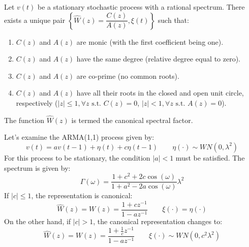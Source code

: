 \begin{theorem}
    Let $v(t)$ be a stationary stochastic process with a rational spectrum.
    There exists a unique pair $\left\{ \hat{W}(z)=\dfrac{C(z)}{A(z)},\xi(t) \right\}$ such that:
    \begin{enumerate}
        \item $C(z)$ and $A(z)$ are monic (with the first coefficient being one).
        \item $C(z)$ and $A(z)$ have the same degree (relative degree equal to zero).
        \item $C(z)$ and $A(z)$ are co-prime (no common roots).
        \item $C(z)$ and $A(z)$ have all their roots in the closed and open unit circle, respectively ($\left\lvert z \right\rvert \leq 1, \forall z \text{ s.t. } C(z)=0$, $\left\lvert z \right\rvert < 1, \forall z \text{ s.t. } A(z)=0$).
    \end{enumerate}
\end{theorem}  
The function $\hat{W}(z)$ is termed the canonical spectral factor.
\begin{example}
    Let's examine the ARMA(1,1) process given by:
    \[v(t)=av(t-1)+\eta(t)+c\eta(t-1) \qquad \eta(\cdot)\sim WN(0,\lambda^2)\]
    For this process to be stationary, the condition $\left\lvert a \right\rvert < 1$ must be satisfied. 
    The spectrum is given by:
    \[\Gamma(\omega)=\dfrac{1+c^2+2c\cos(\omega)}{1+a^2-2a\cos(\omega)}\lambda^2\]
    If $\left\lvert c\right\rvert \leq 1$, the representation is canonical:
    \[\hat{W}(z)=W(z)=\frac{1+cz^{-1}}{1-az^{-1}} \qquad \xi(\cdot)=\eta(\cdot)\]
    On the other hand, if $\left\lvert c\right\rvert > 1$, the canonical representation changes to:
    \[\hat{W}(z)=W(z)=\frac{1+\frac{1}{c}z^{-1}}{1-az^{-1}} \qquad \xi(\cdot)\sim WN(0, c^2\lambda^2)\]
\end{example}
